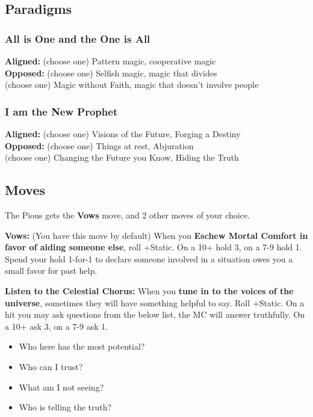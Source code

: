 \documentclass[
  oneside,
  statementpaper,
  9pt]{memoir}
\begin{document}
\hypertarget{paradigms-4}{%
\subsection{Paradigms}\label{paradigms-4}}

\hypertarget{all-is-one-and-the-one-is-all}{%
\subsubsection{All is One and the One is
All}\label{all-is-one-and-the-one-is-all}}

\textbf{Aligned:} (choose one) Pattern magic, cooperative magic\\
\textbf{Opposed:} (choose one) Selfish magic, magic that divides\\
(choose one) Magic without Faith, magic that doesn't involve people

\hypertarget{i-am-the-new-prophet}{%
\subsubsection{I am the New Prophet}\label{i-am-the-new-prophet}}

\textbf{Aligned:} (choose one) Visions of the Future, Forging a
Destiny\\
\textbf{Opposed:} (choose one) Things at rest, Abjuration\\
(choose one) Changing the Future you Know, Hiding the Truth

\hypertarget{moves-4}{%
\subsection{Moves}\label{moves-4}}

The Pious gets the \textbf{Vows} move, and 2 other moves of your choice.

\textbf{Vows:} (You have this move by default) When you \textbf{Eschew
Mortal Comfort in favor of aiding someone else}, roll +Static. On a 10+
hold 3, on a 7-9 hold 1. Spend your hold 1-for-1 to declare someone
involved in a situation owes you a small favor for past help.

\textbf{Listen to the Celestial Chorus:} When you \textbf{tune in to the
voices of the universe}, sometimes they will have something helpful to
say. Roll +Static. On a hit you may ask questions from the below list,
the MC will answer truthfully. On a 10+ ask 3, on a 7-9 ask 1.

\begin{itemize}
\tightlist
\item
  Who here has the most potential?
\item
  Who can I trust?
\item
  What am I not seeing?
\item
  Who is telling the truth?
\end{itemize}
\end{document}
